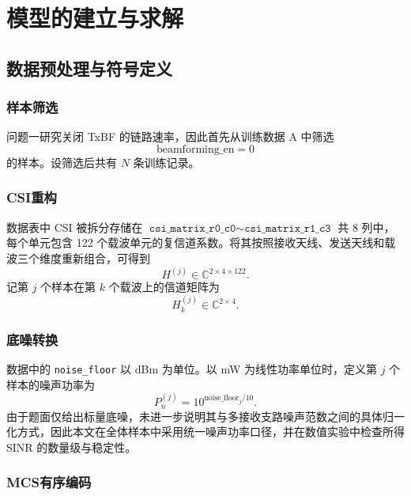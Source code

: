 \documentclass[bwprint]{gmcmthesis}
\numberwithin{figure}{section}
\begin{document}
\section{模型的建立与求解}
\subsection{数据预处理与符号定义}

\subsubsection{样本筛选}

问题一研究关闭 TxBF 的链路速率，因此首先从训练数据 A 中筛选
\begin{equation}
	\mathrm{beamforming\_en}=0
\end{equation}
的样本。设筛选后共有 $N$ 条训练记录。

\subsubsection{CSI重构}

数据表中 CSI 被拆分存储在 $\texttt{csi\_matrix\_r0\_c0}\sim\texttt{csi\_matrix\_r1\_c3}$ 共 8 列中，每个单元包含 122 个载波单元的复信道系数。将其按照接收天线、发送天线和载波三个维度重新组合，可得到
\begin{equation}
	H^{(j)}\in\mathbb{C}^{2\times4\times122}.
\end{equation}
记第 $j$ 个样本在第 $k$ 个载波上的信道矩阵为
\begin{equation}
	H_k^{(j)}\in\mathbb{C}^{2\times4}.
\end{equation}

\subsubsection{底噪转换}

数据中的 \texttt{noise\_floor} 以 dBm 为单位。以 mW 为线性功率单位时，定义第 $j$ 个样本的噪声功率为
\begin{equation}
	\boxed{
	P_n^{(j)}=10^{\mathrm{noise\_floor}_j/10}.
	}
	\label{eq:noise}
\end{equation}
由于题面仅给出标量底噪，未进一步说明其与多接收支路噪声范数之间的具体归一化方式，因此本文在全体样本中采用统一噪声功率口径，并在数值实验中检查所得 SINR 的数量级与稳定性。

\subsubsection{MCS有序编码}
\end{document}
